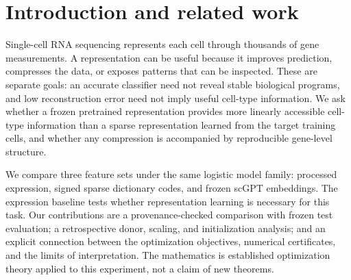 \maketitle
\thispagestyle{fancy}
\begin{abstract}
We compare processed gene expression, sparse dictionary codes, and frozen
scGPT embeddings for human pancreatic cell-type classification using the same
regularized multinomial logistic model family. On a fixed stratified split of
8,506 Baron cells, test Macro-F1 is 0.9939 for expression, 0.9810 for a
64-atom dictionary, and 0.9624 for a small custom scGPT checkpoint. A separate
retrospective nested donor-held-out analysis matches gene availability,
standardizes classifier inputs, and varies dictionary initialization. Its
respective donor-mean Macro-F1 scores are 0.9246, 0.9215, and 0.8823.
Dictionary predictions vary little across the tested initializations, whereas
matched atoms are only moderately reproducible. We relate these observations
to sparse-coding optimality, factor nonidentifiability, and the effect of
scaling on regularization. The results support sparse compression and the
importance of a strong expression baseline within this study; they do not
establish biological pathway recovery or general superiority over pretrained
single-cell models.
\end{abstract}

\section{Introduction and related work}
Single-cell RNA sequencing represents each cell through thousands of gene
measurements. A representation can be useful because it improves prediction,
compresses the data, or exposes patterns that can be inspected. These are
separate goals: an accurate classifier need not reveal stable biological
programs, and low reconstruction error need not imply useful cell-type
information. We ask whether a frozen pretrained representation provides more
linearly accessible cell-type information than a sparse representation learned
from the target training cells, and whether any compression is accompanied by
reproducible gene-level structure.

We compare three feature sets under the same logistic model family: processed
expression, signed sparse dictionary codes, and frozen scGPT embeddings. The
expression baseline tests whether representation learning is necessary for this
task. Our contributions are a provenance-checked comparison with frozen test
evaluation; a retrospective donor, scaling, and initialization analysis; and
an explicit connection between the optimization objectives, numerical
certificates, and the limits of interpretation. The mathematics is established
optimization theory applied to this experiment, not a claim of new theorems.

